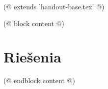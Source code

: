 (@ extends 'handout-base.tex' @)

(@ block content @)
    
    \newpage
    \section{Riešenia}
    
(@ endblock content @)
